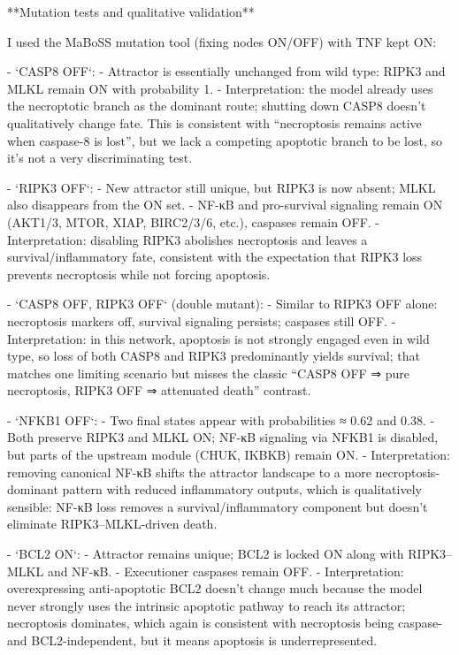 \documentclass[11pt,a4paper]{article}
\begin{document}
\begin{copilotbox}
**Mutation tests and qualitative validation**

I used the MaBoSS mutation tool (fixing nodes ON/OFF) with TNF kept ON:

- `CASP8 OFF`:
  - Attractor is essentially unchanged from wild type: RIPK3 and MLKL remain ON with probability 1.
  - Interpretation: the model already uses the necroptotic branch as the dominant route; shutting down CASP8 doesn’t qualitatively change fate. This is consistent with “necroptosis remains active when caspase-8 is lost”, but we lack a competing apoptotic branch to be lost, so it’s not a very discriminating test.

- `RIPK3 OFF`:
  - New attractor still unique, but RIPK3 is now absent; MLKL also disappears from the ON set.
  - NF-κB and pro-survival signaling remain ON (AKT1/3, MTOR, XIAP, BIRC2/3/6, etc.), caspases remain OFF.
  - Interpretation: disabling RIPK3 abolishes necroptosis and leaves a survival/inflammatory fate, consistent with the expectation that RIPK3 loss prevents necroptosis while not forcing apoptosis.

- `CASP8 OFF, RIPK3 OFF` (double mutant):
  - Similar to RIPK3 OFF alone: necroptosis markers off, survival signaling persists; caspases still OFF.
  - Interpretation: in this network, apoptosis is not strongly engaged even in wild type, so loss of both CASP8 and RIPK3 predominantly yields survival; that matches one limiting scenario but misses the classic “CASP8 OFF ⇒ pure necroptosis, RIPK3 OFF ⇒ attenuated death” contrast.

- `NFKB1 OFF`:
  - Two final states appear with probabilities ≈ 0.62 and 0.38.
  - Both preserve RIPK3 and MLKL ON; NF-κB signaling via NFKB1 is disabled, but parts of the upstream module (CHUK, IKBKB) remain ON.
  - Interpretation: removing canonical NF-κB shifts the attractor landscape to a more necroptosis-dominant pattern with reduced inflammatory outputs, which is qualitatively sensible: NF-κB loss removes a survival/inflammatory component but doesn’t eliminate RIPK3–MLKL-driven death.

- `BCL2 ON`:
  - Attractor remains unique; BCL2 is locked ON along with RIPK3–MLKL and NF-κB.
  - Executioner caspases remain OFF.
  - Interpretation: overexpressing anti-apoptotic BCL2 doesn’t change much because the model never strongly uses the intrinsic apoptotic pathway to reach its attractor; necroptosis dominates, which again is consistent with necroptosis being caspase- and BCL2-independent, but it means apoptosis is underrepresented.


\end{copilotbox}
\end{document}
